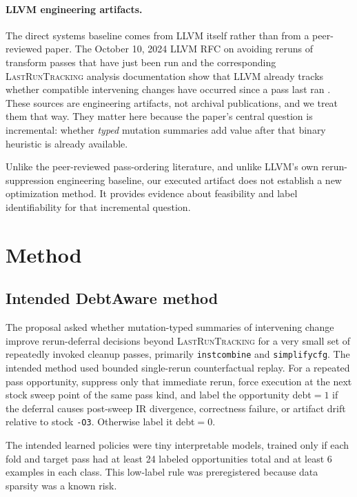 \documentclass{article}
\begin{document}
\paragraph{LLVM engineering artifacts.}
The direct systems baseline comes from LLVM itself rather than from a peer-reviewed paper. The October 10, 2024 LLVM RFC on avoiding reruns of transform passes that have just been run and the corresponding \textsc{LastRunTracking} analysis documentation show that LLVM already tracks whether compatible intervening changes have occurred since a pass last ran \citep{llvm_rfc_avoid_running_2024, llvm_lastruntrackinganalysis_2024}. These sources are engineering artifacts, not archival publications, and we treat them that way. They matter here because the paper's central question is incremental: whether \emph{typed} mutation summaries add value after that binary heuristic is already available.

Unlike the peer-reviewed pass-ordering literature, and unlike LLVM's own rerun-suppression engineering baseline, our executed artifact does not establish a new optimization method. It provides evidence about feasibility and label identifiability for that incremental question.

\section{Method}
\label{sec:method}

\subsection{Intended DebtAware method}

The proposal asked whether mutation-typed summaries of intervening change improve rerun-deferral decisions beyond \textsc{LastRunTracking} for a very small set of repeatedly invoked cleanup passes, primarily \texttt{instcombine} and \texttt{simplifycfg}. The intended method used bounded single-rerun counterfactual replay. For a repeated pass opportunity, suppress only that immediate rerun, force execution at the next stock sweep point of the same pass kind, and label the opportunity debt$=1$ if the deferral causes post-sweep IR divergence, correctness failure, or artifact drift relative to stock \texttt{-O3}. Otherwise label it debt$=0$.

The intended learned policies were tiny interpretable models, trained only if each fold and target pass had at least 24 labeled opportunities total and at least 6 examples in each class. This low-label rule was preregistered because data sparsity was a known risk.
\end{document}
